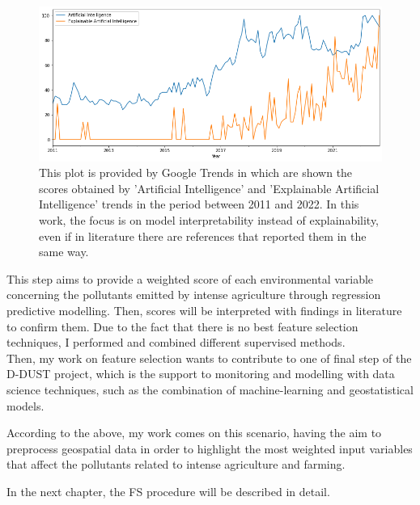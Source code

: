 \begin{figure}[H]
    \includegraphics[scale=0.50]{images/AI_XAI.png}
    \caption{This plot is provided by Google Trends in which are shown the scores obtained by 'Artificial Intelligence' and 'Explainable Artificial Intelligence' trends in the period between 2011 and 2022. In this work, the focus is on model interpretability instead of explainability, even if in literature there are references that reported them in the same way.}
    \label{fig:AI_XAI}
\end{figure}
\bigbreak
This step aims to provide a weighted score of each environmental variable concerning the pollutants emitted by intense agriculture through regression predictive modelling. Then, scores will be interpreted with findings in literature to confirm them.
Due to the fact that there is no best feature selection techniques, I performed and combined different supervised methods. 
\\
Then, my work on feature selection wants to contribute to one of final step of the D-DUST project, which is the support to monitoring and modelling with data science techniques, such as the combination of machine-learning and geostatistical models.
\par
According to the above, my work comes on this scenario, having the aim to preprocess geospatial data in order to highlight the most weighted input variables that affect the pollutants related to intense agriculture and farming.\par
In the next chapter, the FS procedure will be described in detail.
